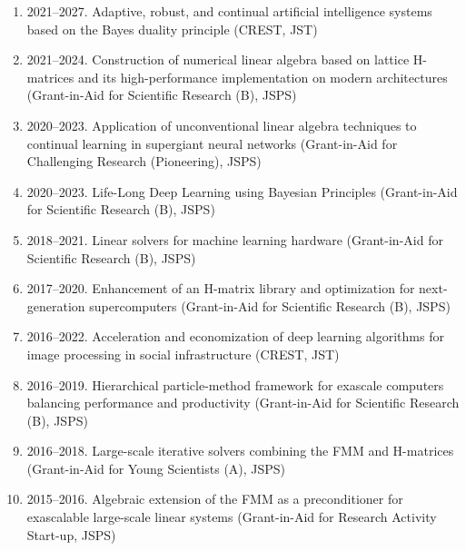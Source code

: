\documentclass[margin,line]{cv}
\begin{document}
\begin{resume}
\begin{enumerate}
\item 2021--2027. Adaptive, robust, and continual artificial intelligence systems based on the Bayes duality principle (CREST, JST)

\item 2021--2024. Construction of numerical linear algebra based on lattice H-matrices and its high-performance implementation on modern architectures (Grant-in-Aid for Scientific Research (B), JSPS)

\item 2020--2023. Application of unconventional linear algebra techniques to continual learning in supergiant neural networks (Grant-in-Aid for Challenging Research (Pioneering), JSPS)

\item 2020--2023. Life-Long Deep Learning using Bayesian Principles (Grant-in-Aid for Scientific Research (B), JSPS)

\item 2018--2021. Linear solvers for machine learning hardware (Grant-in-Aid for Scientific Research (B), JSPS)

\item 2017--2020. Enhancement of an H-matrix library and optimization for next-generation supercomputers (Grant-in-Aid for Scientific Research (B), JSPS)

\item 2016--2022. Acceleration and economization of deep learning algorithms for image processing in social infrastructure (CREST, JST)

\item 2016--2019. Hierarchical particle-method framework for exascale computers balancing performance and productivity (Grant-in-Aid for Scientific Research (B), JSPS)

\item 2016--2018. Large-scale iterative solvers combining the FMM and H-matrices (Grant-in-Aid for Young Scientists (A), JSPS)

\item 2015--2016. Algebraic extension of the FMM as a preconditioner for exascalable large-scale linear systems (Grant-in-Aid for Research Activity Start-up, JSPS)
\end{enumerate}

\end{resume}
\end{document}
